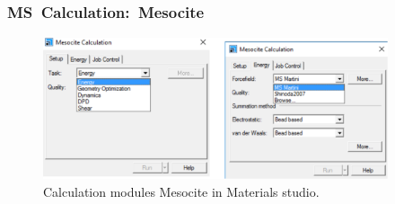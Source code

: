 \frame
{
	\frametitle{\textrm{MS~Calculation:~Mesocite}}
\begin{figure}[h!]
\centering
\includegraphics[height=1.65in,width=4.00in,viewport=0 0 1188 488,clip]{Figures/MS-Caluculator_Mesocite-parameter.png}
\caption{\tiny \textrm{Calculation modules Mesocite in Materials studio.}}%
\label{MS-Mesocite}
\end{figure}
}

